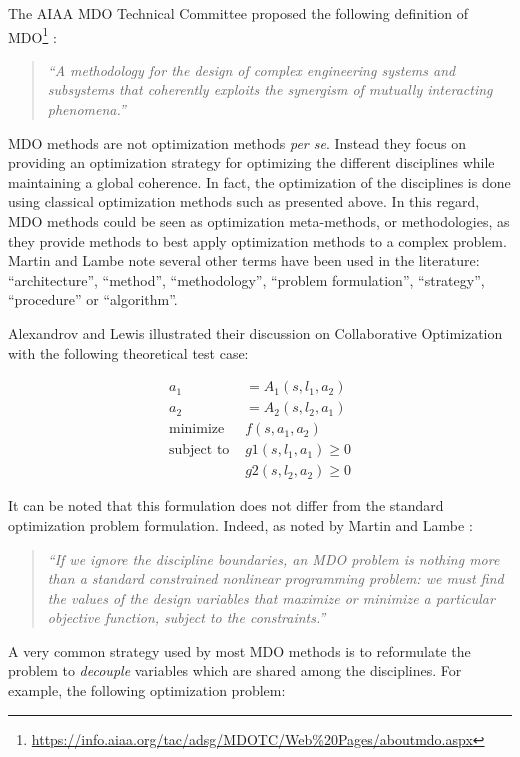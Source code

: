 The AIAA MDO Technical Committee proposed the following definition of MDO\footnote{\url{https://info.aiaa.org/tac/adsg/MDOTC/Web\%20Pages/aboutmdo.aspx}} \cite{american1991current}:
 \begin{quote}\textit{
\enquote{A methodology for the design of complex engineering systems and subsystems that coherently exploits the synergism of mutually interacting phenomena.}}
\end{quote}
MDO methods are not optimization methods \emph{per se}. Instead they focus on providing an optimization strategy for optimizing the different disciplines while maintaining a global coherence. In fact, the optimization of the disciplines is done using classical optimization methods such as presented above. In this regard, MDO methods could be seen as optimization meta-methods, or methodologies, as they provide methods to best apply optimization methods to a complex problem. Martin and Lambe \cite{Lambe:2011:A} note several other terms have been used in the literature: \enquote{architecture}, \enquote{method}, \enquote{methodology}, \enquote{problem formulation}, \enquote{strategy}, \enquote{procedure} or \enquote{algorithm}.

Alexandrov and Lewis illustrated their discussion on Collaborative Optimization \cite{NataliaM.:2000:ACA:886733} with the following theoretical test case:

\begin{align*}
a_1 &= A_1(s, l_1, a_2) \\
a_2 &= A_2(s, l_2, a_1) \\
\text{minimize } &f(s, a_1, a_2) \\
\text{subject to } &g1(s, l_1, a_1) \geq 0 \\
								&g2(s, l_2, a_2) \geq 0
\end{align*}

It can be noted that this formulation does not differ from the standard optimization problem formulation. Indeed, as noted by Martin and Lambe \cite{Lambe:2011:A}:
 \begin{quote}
 \textit{
 \enquote{If we ignore the discipline boundaries, an MDO problem is nothing more than a standard constrained nonlinear programming problem: we must find the values of the design variables that maximize or minimize a particular objective function, subject to the constraints.}}
\end{quote}
A very common strategy used by most MDO methods is to reformulate the problem to \emph{decouple} variables which are shared among the disciplines. 
For example, the following optimization problem:

